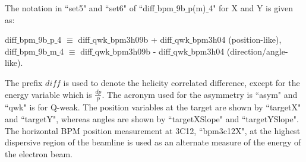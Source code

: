 The notation in ``set5" and ``set6" of ``diff$\_$bpm$\_$9b$\_$p(m)$\_$4" for X and Y is given as:

\noindent
diff$\_$bpm$\_$9b$\_$p$\_$4 $\equiv$ diff$\_$qwk$\_$bpm3h09b + diff$\_$qwk$\_$bpm3h04 (position-like),\\
diff$\_$bpm$\_$9b$\_$m$\_$4 $\equiv$ diff$\_$qwk$\_$bpm3h09b - diff$\_$qwk$\_$bpm3h04 (direction/angle-like).

The prefix $\textit{diff}$ is used to denote the helicity correlated difference, except for the energy variable which is $\displaystyle\frac{dp}{p}$. The acronym used for the asymmetry is ``asym" and ``qwk" is for Q-weak. The position variables at the target are shown by ``targetX" and ``targetY", whereas angles are shown by ``targetXSlope" and ``targetYSlope". The horizontal BPM position measurement at 3C12, ``bpm3c12X", at the highest dispersive region of the beamline is used as an alternate measure of the energy of the electron beam.

%
